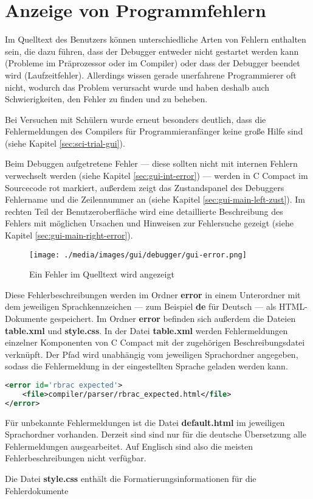 

\section{Anzeige von Programmfehlern}
\label{sec:deb-error}
Im Quelltext des Benutzers können unterschiedliche Arten von Fehlern enthalten sein, die dazu führen, dass der Debugger entweder nicht gestartet werden kann (Probleme im Präprozessor oder im Compiler) oder dass der Debugger beendet wird (Laufzeitfehler). Allerdings wissen gerade unerfahrene Programmierer oft nicht, wodurch das Problem verursacht wurde und haben deshalb auch Schwierigkeiten, den Fehler zu finden und zu beheben.

Bei Versuchen mit Schülern wurde erneut besonders deutlich, dass die Fehlermeldungen des Compilers für Programmieranfänger keine große Hilfe sind (siehe Kapitel \ref{sec:sci-trial-gui}).

Beim Debuggen aufgetretene Fehler --- diese sollten nicht mit internen Fehlern verwechselt werden (siehe Kapitel \ref{sec:gui-int-error}) --- werden in C Compact im Sourcecode rot markiert, außerdem zeigt das Zustandspanel des Debuggers Fehlername und die Zeilennummer an (siehe Kapitel \ref{sec:gui-main-left-zust}). Im rechten Teil der Benutzeroberfläche wird eine detaillierte Beschreibung des Fehlers mit möglichen Ursachen und Hinweisen zur Fehlersuche gezeigt (siehe Kapitel \ref{sec:gui-main-right-error}).

\begin{figure}[h!]
\centering
\texttt{[image: ./media/images/gui/debugger/gui-error.png]}
\caption{Ein Fehler im Quelltext wird angezeigt}
\end{figure}

Diese Fehlerbeschreibungen werden im Ordner \textbf{error} in einem Unterordner mit dem jeweiligen Sprachkennzeichen --- zum Beispiel \textbf{de} für Deutsch --- als HTML-Dokumente gespeichert. Im Ordner \textbf{error} befinden sich außerdem die Dateien \textbf{table.xml} und \textbf{style.css}. In der Datei \textbf{table.xml} werden Fehlermeldungen einzelner Komponenten von C Compact mit der zugehörigen Beschreibungsdatei verknüpft. Der Pfad wird unabhängig vom jeweiligen Sprachordner angegeben, sodass die Fehlermeldung in der eingestellten Sprache geladen werden kann.
\begin{lstlisting}[language=XML]
<error id='rbrac expected'>
	<file>compiler/parser/rbrac_expected.html</file>
</error>
\end{lstlisting}

Für unbekannte Fehlermeldungen ist die Datei \textbf{default.html} im jeweiligen Sprachordner vorhanden. Derzeit sind sind nur für die deutsche Übersetzung alle Fehlermeldungen ausgearbeitet. Auf Englisch sind also die meisten Fehlerbeschreibungen nicht verfügbar.

Die Datei \textbf{style.css} enthält die Formatierungsinformationen für die Fehlerdokumente



